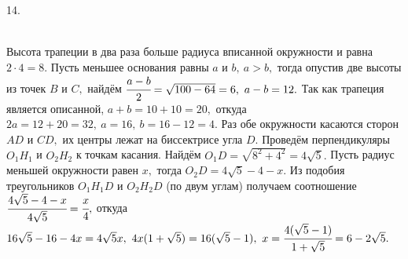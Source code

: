 14. \begin{figure}[ht!]
\end{figure}\\
Высота трапеции в два раза больше радиуса вписанной окружности и равна $2\cdot4=8.$ Пусть меньшее основания равны $a$ и $b,\ a>b,$ тогда опустив две высоты из точек $B$ и $C,$ найдём $\cfrac{a-b}{2}=\sqrt{100-64}=6,\ a-b=12.$ Так как трапеция является описанной, $a+b=10+10=20,$ откуда $2a=12+20=32,\ a=16,\ b=16-12=4.$ Раз обе окружности касаются сторон $AD$ и $CD,$ их центры лежат на биссектрисе угла $D.$ Проведём перпендикуляры $O_1H_1$ и $O_2H_2$ к точкам касания. Найдём $O_1D=\sqrt{8^2+4^2}=4\sqrt{5}.$ Пусть радиус меньшей окружности равен $x,$ тогда  $O_2D=4\sqrt{5}-4-x.$ Из подобия треугольников $O_1H_1D$ и $O_2H_2D$ (по двум углам) получаем соотношение $\cfrac{4\sqrt{5}-4-x }{4\sqrt{5}}=\cfrac{x}{4},$ откуда $16\sqrt{5}-16-4x=4\sqrt{5}x,\ 4x(1+\sqrt{5})=16(\sqrt{5}-1),\ x=\cfrac{4(\sqrt{5}-1)}{1+\sqrt{5}}=6-2\sqrt{5}.$\\
